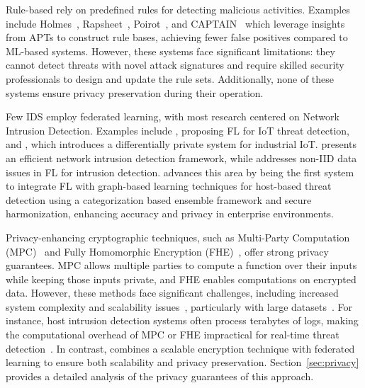  Rule-based \pids rely on predefined rules for detecting malicious activities. Examples include Holmes~\cite{holmes2019}, Rapsheet~\cite{rapsheet2020}, Poirot~\cite{poirot2019}, and CAPTAIN~\cite{wang2024incorporating} which leverage insights from APTs to construct rule bases, achieving fewer false positives compared to ML-based systems. However, these systems face significant limitations: they cannot detect threats with novel attack signatures and require skilled security professionals to design and update the rule sets. Additionally, none of these systems ensure privacy preservation during their operation.

 Few IDS employ federated learning, with most research centered on Network Intrusion Detection. Examples include \cite{man2021intelligent}, proposing FL for IoT threat detection, and \cite{friha20232df}, which introduces a differentially private system for industrial IoT. \cite{li2023efficient} presents an efficient network intrusion detection framework, while \cite{guo2023new} addresses non-IID data issues in FL for intrusion detection. \Sys advances this area by being the first system to integrate FL with graph-based learning techniques for host-based threat detection using a categorization based \gnnshort ensemble framework and secure \wordvec harmonization, enhancing accuracy and privacy in enterprise environments.

 Privacy-enhancing cryptographic techniques, such as Multi-Party Computation (MPC)~\cite{cramer2015secure} and Fully Homomorphic Encryption (FHE)~\cite{armknecht2015guide}, offer strong privacy guarantees. MPC allows multiple parties to compute a function over their inputs while keeping those inputs private, and FHE enables computations on encrypted data. However, these methods face significant challenges, including increased system complexity and scalability issues~\cite{du2001secure, gentry2009fully, asharov2013more}, particularly with large datasets~\cite{menezes2018handbook}. For instance, host intrusion detection systems often process terabytes of logs, making the computational overhead of MPC or FHE impractical for real-time threat detection~\cite{loggc}. In contrast, \Sys combines a scalable encryption technique with federated learning to ensure both scalability and privacy preservation. Section~\ref{sec:privacy} provides a detailed analysis of the privacy guarantees of this approach.

